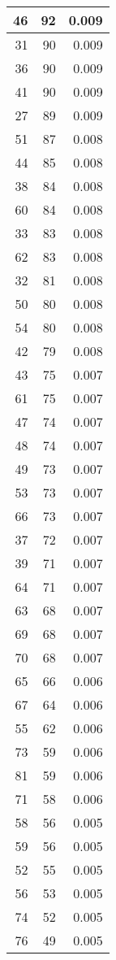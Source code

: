 \documentclass[
]{article}
\begin{document}
\begin{table}
\begin{tabular}[t]{r|r|r}
\hline
46 & 92 & 0.009\\
\hline
31 & 90 & 0.009\\
\hline
36 & 90 & 0.009\\
\hline
41 & 90 & 0.009\\
\hline
27 & 89 & 0.009\\
\hline
51 & 87 & 0.008\\
\hline
44 & 85 & 0.008\\
\hline
38 & 84 & 0.008\\
\hline
60 & 84 & 0.008\\
\hline
33 & 83 & 0.008\\
\hline
62 & 83 & 0.008\\
\hline
32 & 81 & 0.008\\
\hline
50 & 80 & 0.008\\
\hline
54 & 80 & 0.008\\
\hline
42 & 79 & 0.008\\
\hline
43 & 75 & 0.007\\
\hline
61 & 75 & 0.007\\
\hline
47 & 74 & 0.007\\
\hline
48 & 74 & 0.007\\
\hline
49 & 73 & 0.007\\
\hline
53 & 73 & 0.007\\
\hline
66 & 73 & 0.007\\
\hline
37 & 72 & 0.007\\
\hline
39 & 71 & 0.007\\
\hline
64 & 71 & 0.007\\
\hline
63 & 68 & 0.007\\
\hline
69 & 68 & 0.007\\
\hline
70 & 68 & 0.007\\
\hline
65 & 66 & 0.006\\
\hline
67 & 64 & 0.006\\
\hline
55 & 62 & 0.006\\
\hline
73 & 59 & 0.006\\
\hline
81 & 59 & 0.006\\
\hline
71 & 58 & 0.006\\
\hline
58 & 56 & 0.005\\
\hline
59 & 56 & 0.005\\
\hline
52 & 55 & 0.005\\
\hline
56 & 53 & 0.005\\
\hline
74 & 52 & 0.005\\
\hline
76 & 49 & 0.005\\

\end{tabular}
\end{table}
\end{document}
